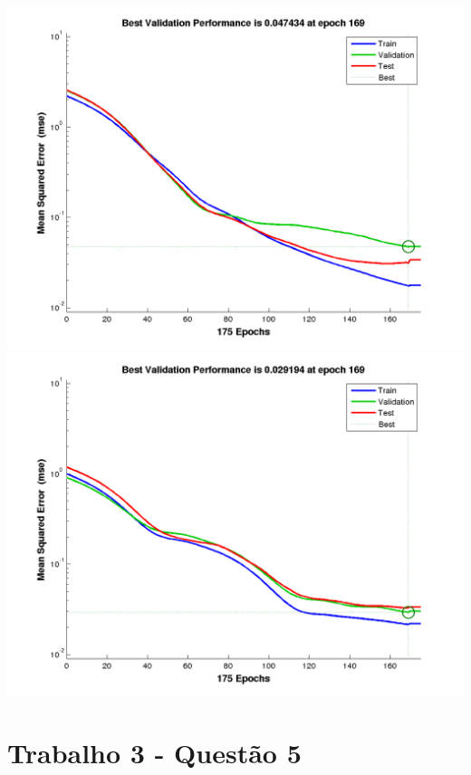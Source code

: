 \documentclass[a4paper]{article}
\begin{document}
\includegraphics[width=\textwidth]{tr4m.png}
\includegraphics[width=\textwidth]{tr5m.png}

\section*{Trabalho 3 - Quest\~ao 5}
\end{document}
